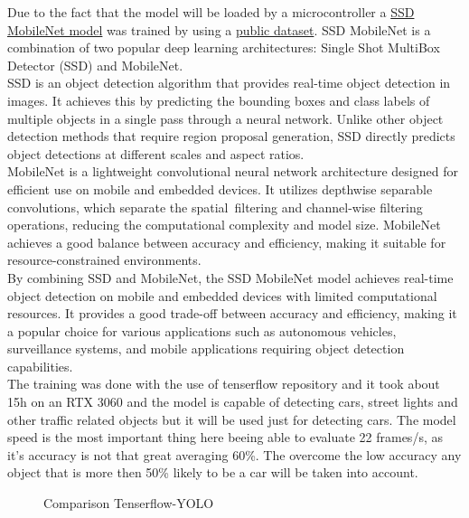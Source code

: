 \documentclass[17pt]{report}
\begin{document}
Due to the fact that the model will be loaded by a microcontroller a
\href{https://github.com/tensorflow/models/blob/master/research/object_detection/g3doc/tf2_detection_zoo.md}{SSD MobileNet model}
was trained by using a \href{https://universe.roboflow.com/pedro-azevedo-3c9ol/bdd100k-3zgda/dataset/5}{public dataset}.
SSD MobileNet is a combination of two popular deep learning architectures:
Single Shot MultiBox Detector (SSD) and MobileNet. \\
\indent
SSD is an object detection algorithm that provides real-time object detection in images.
It achieves this by predicting the bounding boxes and class labels of multiple objects
in a single pass through a neural network. Unlike other object detection methods that
require region proposal generation, SSD directly predicts object detections at different scales
and aspect ratios.\\
\indent
MobileNet is a lightweight convolutional neural network architecture designed for efficient use on
mobile and embedded devices. It utilizes depthwise separable convolutions, which separate the spatial\
filtering and channel-wise filtering operations, reducing the computational complexity and model size.
MobileNet achieves a good balance between accuracy and efficiency, making it suitable for
resource-constrained environments.\\
\indent
By combining SSD and MobileNet, the SSD MobileNet model achieves real-time object detection on mobile
and embedded devices with limited computational resources. It provides a good trade-off between accuracy
and efficiency, making it a popular choice for various applications such as autonomous vehicles,
surveillance systems, and mobile applications requiring object detection capabilities.\\
\indent
The training was done with the use of tenserflow repository and it took about 15h
on an RTX 3060 and the model is capable of detecting cars, street lights and other
traffic related objects but it will be used just for detecting cars. The model speed
is the most important thing here beeing able to evaluate 22 frames/s, as it's
accuracy is not that great averaging 60\%. The overcome the low accuracy any object 
that is more then 50\% likely to be a car will be taken into account.\\

\begin{figure}[h!]
    \centering
    \label{fig:Comparison Tenserflow-YOLO}
    \caption{Comparison Tenserflow-YOLO}
\end{figure}
\end{document}
